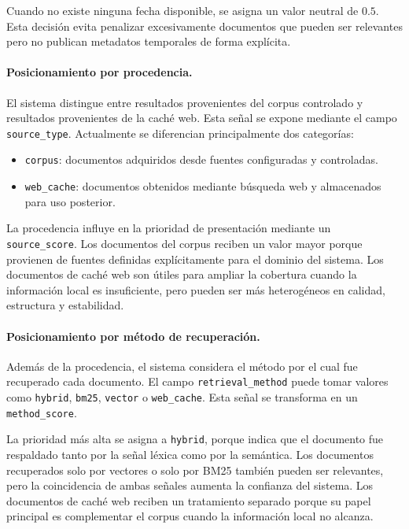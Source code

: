 \documentclass[11pt]{article}
\begin{document}
Cuando no existe ninguna fecha disponible, se asigna un valor neutral de \(0.5\). Esta decisión
evita penalizar excesivamente documentos que pueden ser relevantes pero no publican metadatos
temporales de forma explícita.

\paragraph{Posicionamiento por procedencia.}
El sistema distingue entre resultados provenientes del corpus controlado y resultados provenientes
de la caché web. Esta señal se expone mediante el campo \texttt{source\_type}. Actualmente se
diferencian principalmente dos categorías:

\begin{itemize}
    \item \texttt{corpus}: documentos adquiridos desde fuentes configuradas y controladas.
    \item \texttt{web\_cache}: documentos obtenidos mediante búsqueda web y almacenados para uso posterior.
\end{itemize}

La procedencia influye en la prioridad de presentación mediante un \texttt{source\_score}. Los
documentos del corpus reciben un valor mayor porque provienen de fuentes definidas
explícitamente para el dominio del sistema. Los documentos de caché web son útiles para ampliar la
cobertura cuando la información local es insuficiente, pero pueden ser más heterogéneos en
calidad, estructura y estabilidad.

\paragraph{Posicionamiento por método de recuperación.}
Además de la procedencia, el sistema considera el método por el cual fue recuperado cada
documento. El campo \texttt{retrieval\_method} puede tomar valores como \texttt{hybrid},
\texttt{bm25}, \texttt{vector} o \texttt{web\_cache}. Esta señal se transforma en un
\texttt{method\_score}.

La prioridad más alta se asigna a \texttt{hybrid}, porque indica que el documento fue respaldado
tanto por la señal léxica como por la semántica. Los documentos recuperados solo por vectores o
solo por BM25 también pueden ser relevantes, pero la coincidencia de ambas señales aumenta la
confianza del sistema. Los documentos de caché web reciben un tratamiento separado porque su
papel principal es complementar el corpus cuando la información local no alcanza.
\end{document}
